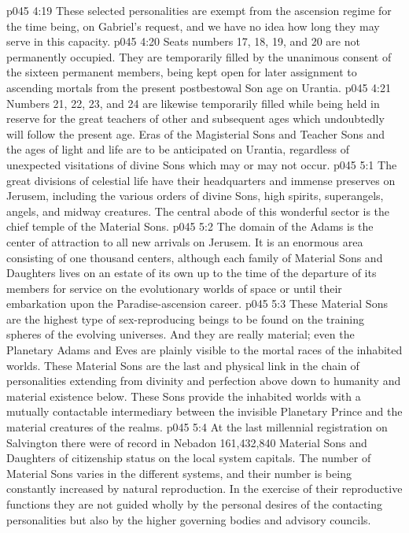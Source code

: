 \vs p045 4:19 \pc These selected personalities are exempt from the ascension regime for the time being, on Gabriel’s request, and we have no idea how long they may serve in this capacity.
\vs p045 4:20 Seats numbers 17, 18, 19, and 20 are not permanently occupied. They are temporarily filled by the unanimous consent of the sixteen permanent members, being kept open for later assignment to ascending mortals from the present postbestowal Son age on Urantia.
\vs p045 4:21 Numbers 21, 22, 23, and 24 are likewise temporarily filled while being held in reserve for the great teachers of other and subsequent ages which undoubtedly will follow the present age. Eras of the Magisterial Sons and Teacher Sons and the ages of light and life are to be anticipated on Urantia, regardless of unexpected visitations of divine Sons which may or may not occur.
\vs p045 5:1 The great divisions of celestial life have their headquarters and immense preserves on Jerusem, including the various orders of divine Sons, high spirits, superangels, angels, and midway creatures. The central abode of this wonderful sector is the chief temple of the Material Sons.
\vs p045 5:2 The domain of the Adams is the center of attraction to all new arrivals on Jerusem. It is an enormous area consisting of one thousand centers, although each family of Material Sons and Daughters lives on an estate of its own up to the time of the departure of its members for service on the evolutionary worlds of space or until their embarkation upon the Paradise\hyp{}ascension career.
\vs p045 5:3 These Material Sons are the highest type of sex\hyp{}reproducing beings to be found on the training spheres of the evolving universes. And they are really material; even the Planetary Adams and Eves are plainly visible to the mortal races of the inhabited worlds. These Material Sons are the last and physical link in the chain of personalities extending from divinity and perfection above down to humanity and material existence below. These Sons provide the inhabited worlds with a mutually contactable intermediary between the invisible Planetary Prince and the material creatures of the realms.
\vs p045 5:4 \pc At the last millennial registration on Salvington there were of record in Nebadon 161,432,840 Material Sons and Daughters of citizenship status on the local system capitals. The number of Material Sons varies in the different systems, and their number is being constantly increased by natural reproduction. In the exercise of their reproductive functions they are not guided wholly by the personal desires of the contacting personalities but also by the higher governing bodies and advisory councils.
